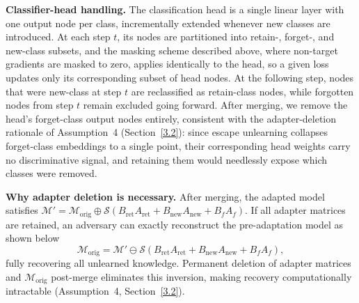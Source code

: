\noindent\textbf{Classifier-head handling.}
The classification head is a single linear layer with one output node per class, incrementally extended whenever new classes are introduced. At each step $t$, its nodes are partitioned into retain-, forget-, and new-class subsets, and the masking scheme described above, where non-target gradients are masked to zero, applies identically to the head, so a given loss updates only its corresponding subset of head nodes. At the following step, nodes that were new-class at step $t$ are reclassified as retain-class nodes, while forgotten nodes from step $t$ remain excluded going forward. After merging, we remove the head's forget-class output nodes entirely, consistent with the adapter-deletion rationale of Assumption~4 (Section~\ref{3.2}): since escape unlearning collapses forget-class embeddings to a single point, their corresponding head weights carry no discriminative signal, and retaining them would needlessly expose which classes were removed.



\noindent\textbf{Why adapter deletion is necessary.}
After merging, the adapted model satisfies $\mathcal{M}' = \mathcal{M}_\text{orig} \oplus \mathcal{S}(B_\text{ret}A_\text{ret} + B_\text{new}A_\text{new} + B_f A_f)$. If all adapter matrices are retained, an adversary can exactly reconstruct the pre-adaptation model as shown below
\begin{equation}
\mathcal{M}_\text{orig} = \mathcal{M}' \ominus \mathcal{S}\!\left(B_\text{ret}A_\text{ret} + B_\text{new}A_\text{new} + B_f A_f\right),
\label{eq:recovery}
\end{equation}
fully recovering all unlearned knowledge. Permanent deletion of adapter matrices and $\mathcal{M}_\text{orig}$ post-merge eliminates this inversion, making recovery computationally intractable (Assumption~4, Section~\ref{3.2}).


